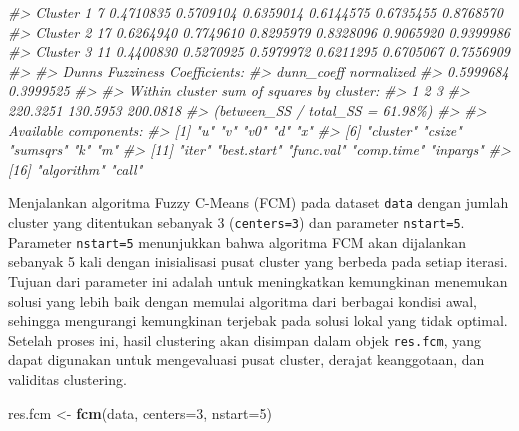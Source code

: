 \documentclass[
  oneside]{book}
\newenvironment{Shaded}{\begin{snugshade}}{\end{snugshade}}
\newcommand{\AttributeTok}[1]{\textcolor[rgb]{0.13,0.29,0.53}{#1}}
\newcommand{\CommentTok}[1]{\textcolor[rgb]{0.56,0.35,0.01}{\textit{#1}}}
\newcommand{\DecValTok}[1]{\textcolor[rgb]{0.00,0.00,0.81}{#1}}
\newcommand{\FunctionTok}[1]{\textcolor[rgb]{0.13,0.29,0.53}{\textbf{#1}}}
\newcommand{\NormalTok}[1]{#1}
\newcommand{\OtherTok}[1]{\textcolor[rgb]{0.56,0.35,0.01}{#1}}
\begin{document}
\begin{Shaded}
\begin{Highlighting}[]
\CommentTok{\#\textgreater{} Cluster 1    7 0.4710835 0.5709104 0.6359014 0.6144575 0.6735455 0.8768570}
\CommentTok{\#\textgreater{} Cluster 2   17 0.6264940 0.7749610 0.8295979 0.8328096 0.9065920 0.9399986}
\CommentTok{\#\textgreater{} Cluster 3   11 0.4400830 0.5270925 0.5979972 0.6211295 0.6705067 0.7556909}
\CommentTok{\#\textgreater{} }
\CommentTok{\#\textgreater{} Dunn\textquotesingle{}s Fuzziness Coefficients:}
\CommentTok{\#\textgreater{} dunn\_coeff normalized }
\CommentTok{\#\textgreater{}  0.5999684  0.3999525 }
\CommentTok{\#\textgreater{} }
\CommentTok{\#\textgreater{} Within cluster sum of squares by cluster:}
\CommentTok{\#\textgreater{}        1        2        3 }
\CommentTok{\#\textgreater{} 220.3251 130.5953 200.0818 }
\CommentTok{\#\textgreater{} (between\_SS / total\_SS =  61.98\%) }
\CommentTok{\#\textgreater{} }
\CommentTok{\#\textgreater{} Available components: }
\CommentTok{\#\textgreater{}  [1] "u"          "v"          "v0"         "d"          "x"         }
\CommentTok{\#\textgreater{}  [6] "cluster"    "csize"      "sumsqrs"    "k"          "m"         }
\CommentTok{\#\textgreater{} [11] "iter"       "best.start" "func.val"   "comp.time"  "inpargs"   }
\CommentTok{\#\textgreater{} [16] "algorithm"  "call"}
\end{Highlighting}
\end{Shaded}

Menjalankan algoritma Fuzzy C-Means (FCM) pada dataset \texttt{data} dengan jumlah cluster yang ditentukan sebanyak 3 (\texttt{centers=3}) dan parameter \texttt{nstart=5}. Parameter \texttt{nstart=5} menunjukkan bahwa algoritma FCM akan dijalankan sebanyak 5 kali dengan inisialisasi pusat cluster yang berbeda pada setiap iterasi. Tujuan dari parameter ini adalah untuk meningkatkan kemungkinan menemukan solusi yang lebih baik dengan memulai algoritma dari berbagai kondisi awal, sehingga mengurangi kemungkinan terjebak pada solusi lokal yang tidak optimal. Setelah proses ini, hasil clustering akan disimpan dalam objek \texttt{res.fcm}, yang dapat digunakan untuk mengevaluasi pusat cluster, derajat keanggotaan, dan validitas clustering.

\begin{Shaded}
\begin{Highlighting}[]
\NormalTok{res.fcm }\OtherTok{\textless{}{-}} \FunctionTok{fcm}\NormalTok{(data, }\AttributeTok{centers=}\DecValTok{3}\NormalTok{, }\AttributeTok{nstart=}\DecValTok{5}\NormalTok{)}
\end{Highlighting}
\end{Shaded}
\end{document}
